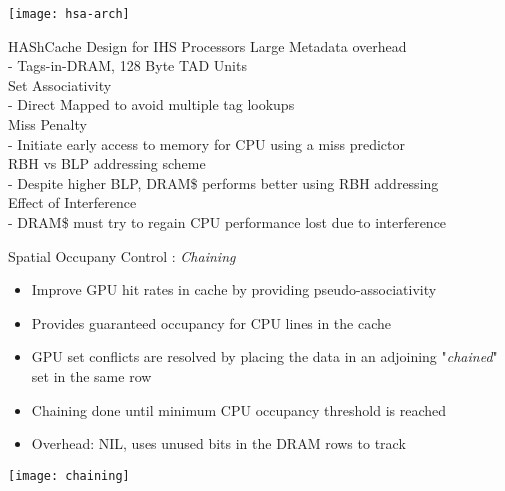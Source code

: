 \documentclass[final,t]{beamer}
\begin{document}
\begin{frame}[t,fragile]{}
\begin{columns}[t]
\begin{column}{.47\linewidth}

	\centering
   \texttt{[image: hsa-arch]}
   
    \begin{exampleblock}{HAShCache Design for IHS Processors}
        \large Large Metadata overhead \\
        \normalsize \qquad- Tags-in-DRAM, 128 Byte TAD Units \\
        \large Set Associativity \\
        \normalsize \qquad- Direct Mapped to avoid multiple tag lookups \\
        \large Miss Penalty \\
        \normalsize \qquad- Initiate early access to memory for CPU using a miss predictor \\
        \large RBH vs BLP addressing scheme \\
        \normalsize \qquad- Despite higher BLP, DRAM\$ performs better using RBH addressing\\
        \large Effect of Interference \\
        \normalsize \qquad- DRAM\$ must try to regain CPU performance lost due to interference\\
    \end{exampleblock}
    
    \begin{exampleblock}{Spatial Occupany Control : \textit{Chaining}}
    \begin{itemize}
	    \item Improve GPU hit rates in cache by providing pseudo-associativity
	    \item Provides guaranteed occupancy for CPU lines in the cache
	    \item GPU set conflicts are resolved by placing the data in an adjoining "\textit{chained}" set in the same row
	    \item Chaining done until minimum CPU occupancy threshold is reached
	    \item Overhead: NIL, uses unused bits in the DRAM rows to track
    \end{itemize}
    \vspace{\baselineskip}\linebreak
    \centering
    \texttt{[image: chaining]}
    \end{exampleblock}
    
       
\end{column}

\end{columns}

\end{frame}
\end{document}

